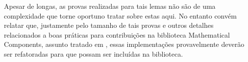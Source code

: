 
        Apesar de longas, as provas realizadas para tais lemas não são de uma complexidade que torne oportuno tratar sobre estas aqui. No entanto convém relatar que, justamente pelo tamanho de tais provas e outros detalhes relacionados a boas práticas para contribuições na biblioteca Mathematical Components, assunto tratado em \cite{mathcomp-contributing}, essas implementações provavelmente deverão ser refatoradas para que possam ser incluídas na biblioteca.


